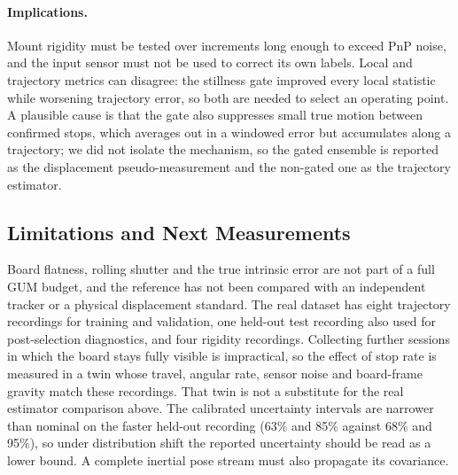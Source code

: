 \paragraph{Implications.}
Mount rigidity must be tested over increments long enough to exceed PnP noise,
and the input sensor must not be used to correct its own labels. Local and
trajectory metrics can disagree: the stillness gate improved every local
statistic while worsening trajectory error, so both are needed to select an
operating point. A plausible cause is that the gate also suppresses small true
motion between confirmed stops, which averages out in a windowed error but
accumulates along a trajectory; we did not isolate the mechanism, so the gated
ensemble is reported as the displacement pseudo-measurement and the non-gated
one as the trajectory estimator.

\subsection{Limitations and Next Measurements}
Board flatness, rolling shutter and the true intrinsic error are not part of a
full GUM budget, and the reference has not been compared with an independent
tracker or a physical displacement standard. The real dataset has eight
trajectory recordings for training and validation, one held-out test recording
also used for post-selection diagnostics, and four rigidity recordings.
Collecting further sessions in which the board stays fully visible is
impractical, so the effect of stop rate is measured in a twin whose travel,
angular rate, sensor noise and board-frame gravity match these recordings.
That twin is not a substitute for the real estimator comparison above. The
calibrated uncertainty intervals are narrower than nominal on the faster
held-out recording (63\% and 85\% against 68\% and 95\%), so under
distribution shift the reported uncertainty should be read as a lower bound.
A complete inertial pose stream must also propagate its covariance.
